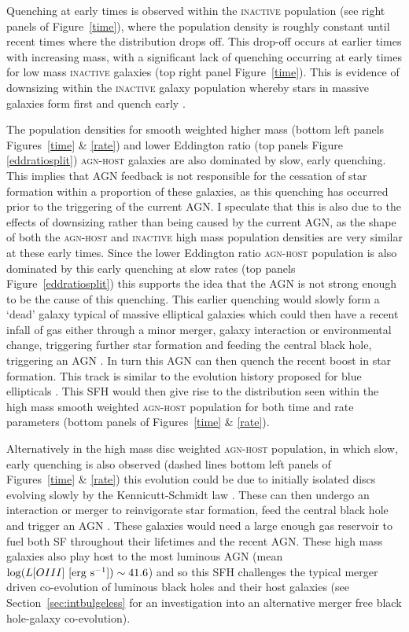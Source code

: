 Quenching at early times is observed within the \textsc{inactive} population (see right panels of Figure~\ref{time}), where the population density is roughly constant until recent times where the distribution drops off.  This drop-off occurs at earlier times with increasing mass, with a significant lack of quenching occurring at early times for low mass \textsc{inactive} galaxies (top right panel Figure~\ref{time}). This is evidence of downsizing within the \textsc{inactive} galaxy population whereby stars in massive galaxies form first and quench early \citep{Cowie96, Thomas10}. 

The population densities for smooth weighted higher mass (bottom left panels Figures~\ref{time} \& \ref{rate}) and lower Eddington ratio (top panels Figure \ref{eddratiosplit}) \textsc{agn-host} galaxies are also dominated by slow, early quenching. This implies that AGN feedback is not responsible for the cessation of star formation within a proportion of these galaxies, as this quenching has occurred prior to the triggering of the current AGN. I speculate that this is also due to the effects of downsizing rather than being caused by the current AGN, as the shape of both the \textsc{agn-host} and \textsc{inactive} high mass population densities are very similar at these early times. Since the lower Eddington ratio \textsc{agn-host} population is also dominated by this early quenching at slow rates (top panels Figure~\ref{eddratiosplit}) this supports the idea that the AGN is not strong enough to be the cause of this quenching.  This earlier quenching would slowly form a `dead' galaxy typical of massive elliptical galaxies which could then have a recent infall of gas either through a minor merger, galaxy interaction or environmental change, triggering further star formation and feeding the central black hole, triggering an AGN \citep{kaviraj14b}. In turn this AGN can then quench the recent boost in star formation. This track is similar to the evolution history proposed for blue ellipticals \citep[][and detected in the top panel of Figure~\ref{blue_c}]{Kaviraj13, McIntosh14, Haines15}. This SFH would then give rise to the distribution seen within the high mass smooth weighted \textsc{agn-host} population for both time and rate parameters (bottom panels of Figures~\ref{time} \& \ref{rate}).

Alternatively in the high mass disc weighted \textsc{agn-host} population, in which slow, early quenching is also observed (dashed lines bottom left panels of Figures~\ref{time} \& \ref{rate}) this evolution could be due to initially isolated discs evolving slowly by the Kennicutt-Schmidt law \citep{schmidt59, kennicutt97}. These can then undergo an interaction or merger to reinvigorate star formation, feed the central black hole and trigger an AGN \citep{Varela04, emsellem15}. These galaxies would need a large enough gas reservoir to fuel both SF throughout their lifetimes and the recent AGN. These high mass galaxies also play host to the most luminous AGN (mean $\log (L[OIII] ~[\rm{erg}~s^{-1}]) \sim 41.6$) and so this SFH challenges the typical merger driven co-evolution of luminous black holes and their host galaxies (see Section~\ref{sec:intbulgeless} for an investigation into an alternative merger free black hole-galaxy co-evolution). 

